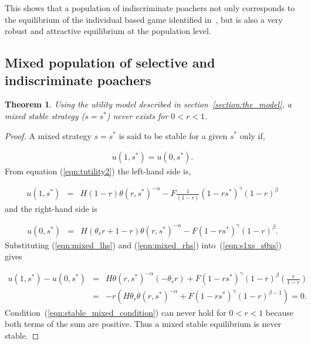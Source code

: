 \documentclass[10pt]{article}
\newtheorem{theorem}{Theorem}
\begin{document}
This shows that a population of indiscriminate poachers
not only corresponds to the equilibrium of the individual based
game identified in~\cite{Lee}, but is also a very robust and attractive
equilibrium at the population level.

\subsection{Mixed population of selective and indiscriminate poachers}

\begin{theorem}\label{theorem:mixed}
Using the utility model described in section~\ref{section:the_model}, a mixed
stable strategy (\(s=s^*\)) never exists for \(0 < r <1\).  
\end{theorem}

\begin{proof}
    A mixed strategy \(s = s^*\) is said to be stable for a
    given \(s^*\) only if,

    \begin{eqnarray}
    \label{eqn:s1xs_s0xs}
    u(1,s^*) = u(0,s^*).
    \end{eqnarray}
    From equation (\ref{eqn:tutility2}) the left-hand side is,

    \begin{eqnarray}
    \label{eqn:mixed_lhs}
    u(1,s^*)&=&
    H(1 - r) \theta(r, s^*)^{-\alpha} - F \frac{1}{(1 - r)}(1 - rs^*)^{\gamma}(1 - r)^{\beta} 
    \end{eqnarray}
    and the right-hand side is

    \begin{eqnarray}
    \label{eqn:mixed_rhs}
    u(0,s^*)&=&
    H(\theta_rr + 1 - r)\theta(r, s^*)^{-\alpha} - F(1 - rs^*)^{\gamma}(1 - r)^{\beta}.
    \end{eqnarray}
    Substituting (\ref{eqn:mixed_lhs}) and (\ref{eqn:mixed_rhs}) into~(\ref{eqn:s1xs_s0xs}) gives

    \begin{eqnarray}\label{eqn:stable_mixed}
        u(1,s^*) - u(0,s^*) & = & H\theta(r, s^*)^{-\alpha} (-\theta_r r)  + F (1 - rs^*)^{\gamma}(1 - r)^{\beta}(\frac{r}{1-r})\\
    \label{eqn:stable_mixed_condition}
      & = &   - r (H \theta_r \theta(r, s^*)^{-\alpha}  + F (1 - rs^*)^{\gamma}(1 - r)^{\beta - 1}) = 0.
    \end{eqnarray}
    Condition~(\ref{eqn:stable_mixed_condition}) can never hold for \(0 < r <1\)
    because both terms of the sum are positive. Thus a mixed stable equilibrium
    is never stable.
\end{proof}
\end{document}
